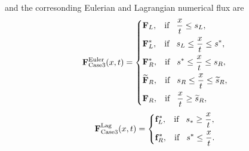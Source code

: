 \documentclass[review]{elsarticle}
\begin{document}
  and the corresonding Eulerian and Lagrangian numerical flux are
 \begin{equation}\label{eq:HLLCEP3}
   \mathbf{F}^{\text{Euler}}_{\text{Case3}}(x,t) = \left\{ \begin{aligned}
        & \mathbf{F}_L, \hspace{0.3cm} \text{if} \hspace{0.3cm} \frac{x}{t}\le s_L, \\
        & \mathbf{F}_L^*, \hspace{0.3cm} \text{if} \hspace{0.3cm} s_L\le \frac{x}{t} \le s^*, \\
        & \mathbf{F}_R^*, \hspace{0.3cm} \text{if} \hspace{0.3cm} s^*\le \frac{x}{t} \le s_R, \\
        &  \widetilde{\mathbf{F}}_R, \hspace{0.3cm} \text{if} \hspace{0.3cm} s_R\le \frac{x}{t} \le \widetilde{s}_R,\\
        & \mathbf{F}_R, \hspace{0.3cm} \text{if} \hspace{0.3cm} \frac{x}{t}\ge \widetilde{s}_R, \\
      \end{aligned}
    \right.
  \end{equation}
\begin{equation}
    \mathbf{F}^{\text{Lag}}_{\text{Case3}}(x,t) = \left\{ \begin{aligned}
        & \mathbf{f}_L^*, \hspace{0.3cm} \text{if} \hspace{0.3cm} s_*\ge \frac{x}{t},\\
        & \mathbf{f}_R^*, \hspace{0.3cm} \text{if} \hspace{0.3cm} s^*\le \frac{x}{t}.\\
      \end{aligned}
    \right.
  \end{equation}
%
\end{document}
